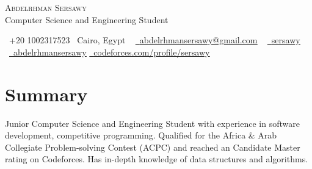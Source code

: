 \documentclass[letterpaper,11pt]{article}
\begin{document}

\begin{center}
    {\Huge \scshape Abdelrhman Sersawy} \\ \vspace{1pt}
    Computer Science and Engineering Student \\ \vspace{1pt}    
    
    \small \raisebox{-0.1\height}\faPhone\ +20 1002317523
    \small \raisebox{-0.1\height}\faMap\ Cairo, Egypt
    ~ \href{mailto:abdelrhmansersawy@gmail.com}{\raisebox{-0.2\height}\faEnvelope\  \underline{abdelrhmansersawy@gmail.com}} 
    ~ \href{https://www.linkedin.com/in/sersawy/}{\raisebox{-0.2\height}\faLinkedin\ \underline{sersawy}}  
    \newline
    ~\href{https://github.com/Abdelrhmansersawy}{\raisebox{-0.2\height}\faGithub\ \underline{abdelrhmansersawy}}
    \href{https://codeforces.com/profile/sersawy}{\raisebox{-0.2\height}\ \underline{codeforces.com/profile/sersawy}}
    \vspace{-8pt}
\end{center}

\section{Summary}
Junior Computer Science and Engineering Student with  experience in software development, competitive
programming. Qualified for the Africa \& Arab Collegiate Problem-solving Contest (ACPC) and reached an Candidate Master rating on Codeforces. Has in-depth knowledge of data structures and algorithms. \vspace{-10pt}
\end{document}
